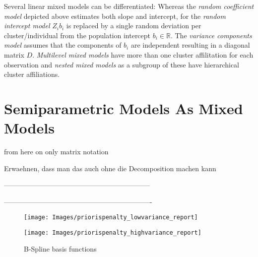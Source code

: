 \documentclass[12pt]{article}
\begin{document}
Several linear mixed models can be differentiated:
Whereas the \textit{random coefficient model} depicted above estimates both slope and intercept, for the \textit{random intercept model} $Z_ib_i$ is replaced by a single random deviation per cluster/individual from the population intercept $b_i \in \mathbb{R}$. The \textit{variance components model} assumes that the components of $b_i$ are independent resulting in a diagonal matrix $D$.
\textit{Multilevel mixed models} have more than one cluster affilitation for each observation and \textit{nested mixed models} as a subgroup of these have hierarchical cluster affiliations.


\section{Semiparametric Models As Mixed Models}\label{representation}
from here on only matrix notation

Erwaehnen, dass man das auch ohne die Decomposition machen kann

---------------------------------------------------------------











----------------------------------------------------------------

\begin{figure}
\centering
\hspace{-5.5em}
\begin{minipage}{.5\textwidth}
  \centering
  \texttt{[image: Images/priorispenalty\_lowvariance\_report]}
\end{minipage}%
\hspace{-2em}
\begin{minipage}{.5\textwidth}
  \centering
  \texttt{[image: Images/priorispenalty\_highvariance\_report]}
\end{minipage}
\vspace{-1em}
\caption[caption]{B-Spline basis functions}\label{bsplines}
\end{figure}


\cite{fahrmeir2013regression}

\cite{kneib2006mixed}

\cite{wood2017generalized}

\cite{wood2011fast}
\end{document}
